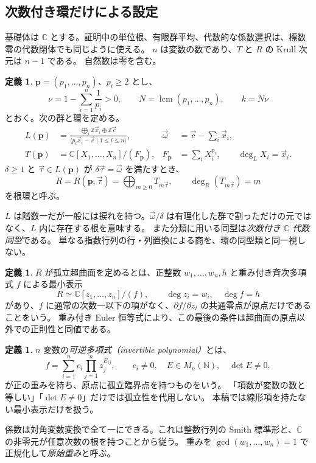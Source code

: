 \documentclass[11pt,a4paper]{ltjsarticle}
\numberwithin{equation}{section}
\theoremstyle{definition}
\newtheorem{definition}[theorem]{定義}
\newcommand{\Z}{\mathbb Z}\newcommand{\N}{\mathbb N}\newcommand{\Q}{\mathbb Q}\newcommand{\C}{\mathbb C}
\newcommand{\cc}{\vec c}\newcommand{\xx}{\vec x}\newcommand{\om}{\vec\omega}\newcommand{\ta}{\vec\tau}
\newcommand{\bp}{\mathbf p}\newcommand{\bw}{\mathbf w}\newcommand{\one}{\mathbf 1}
\newcommand{\lcm}{\operatorname{lcm}}\newcommand{\Frac}{\operatorname{Frac}}\newcommand{\Spec}{\operatorname{Spec}}
\begin{document}
\subsection{次数付き環だけによる設定}
基礎体は $\C$ とする。証明中の単位根、有限群平均、代数的な係数選択は、標数零の代数閉体でも同じように使える。
$n$ は変数の数であり、$T$ と $R$ の Krull 次元は $n-1$ である。
自然数は零を含む。
\begin{definition}\label{def:rootring}
$\bp=(p_1,\dots,p_n)$、$p_i\ge2$ とし、
\begin{equation}\label{eq:nu}
 \nu=1-\sum_{i=1}^n\frac1{p_i}>0,\qquad
 N=\lcm(p_1,\dots,p_n),\qquad k=N\nu
\end{equation}
とおく。次の群と環を定める。
\begin{align}
 L(\bp)&=\frac{\bigoplus_i\Z\xx_i\oplus\Z\cc}
 {\langle p_i\xx_i-\cc\mid1\le i\le n\rangle},
 &\om&=\cc-\sum_i\xx_i,\label{eq:L}\\
 T(\bp)&=\C[X_1,\dots,X_n]/(F_{\bp}),
 &F_{\bp}&=\sum_i X_i^{p_i},\qquad\deg_L X_i=\xx_i.\label{eq:T}
\end{align}
$\delta\ge1$ と $\ta\in L(\bp)$ が $\delta\ta=\om$ を満たすとき、
\begin{equation}\label{eq:R}
 R=R(\bp,\ta)=\bigoplus_{m\ge0}T_{m\ta},\qquad \deg_R(T_{m\ta})=m
\end{equation}
を根環と呼ぶ。
\end{definition}
$L$ は階数一だが一般には捩れを持つ。$\om/\delta$ は有理化した群で割っただけの元ではなく、$L$ 内に存在する根を意味する。
また分類に用いる同型は\emph{次数付き $\C$ 代数同型}である。
単なる指数行列の行・列置換による商を、環の同型類と同一視しない。

\begin{definition}\label{def:ihs}
$R$ が孤立超曲面を定めるとは、正整数 $w_1,\dots,w_n,h$ と重み付き斉次多項式 $f$ による最小表示
\begin{equation}\label{eq:hs}
 R\simeq\C[z_1,\dots,z_n]/(f),\qquad\deg z_i=w_i,\quad\deg f=h
\end{equation}
があり、$f$ に通常の次数一以下の項がなく、$\partial f/\partial z_i$ の共通零点が原点だけであることをいう。
重み付き Euler 恒等式により、この最後の条件は超曲面の原点以外での正則性と同値である。
\end{definition}

\begin{definition}\label{def:invertible}
$n$ 変数の\emph{可逆多項式（invertible polynomial）}とは、
\[
 f=\sum_{i=1}^n c_i\prod_{j=1}^n z_j^{E_{ij}},\qquad
 c_i\ne0,\quad E\in M_n(\N),\quad\det E\ne0,
\]
が正の重みを持ち、原点に孤立臨界点を持つものをいう。
「項数が変数の数と等しい」「$\det E\ne0$」だけでは孤立性を代用しない。
本稿では線形項を持たない最小表示だけを扱う。
\end{definition}
係数は対角変数変換で全て一にできる。これは整数行列の Smith 標準形と、$\C$ の非零元が任意次数の根を持つことから従う。
重みを $\gcd(w_1,\dots,w_n)=1$ で正規化して\emph{原始重み}と呼ぶ。
\end{document}
